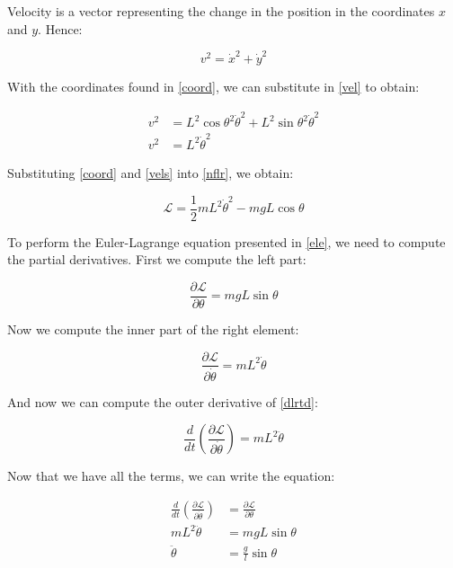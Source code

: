 \documentclass{article}
\begin{document}
Velocity is a vector representing the change in the position in the coordinates $x$ and $y$. Hence:

\begin{equation} \label{vel}
	v^2=\dot{x}^2+\dot{y}^2
\end{equation}

With the coordinates found in \ref{coord}, we can substitute in \ref{vel} to obtain:

\begin{equation} \label{vels}
	\begin{split}
		v^2&=L^2\cos{\theta}^2\dot{\theta}^2+L^2\sin{\theta}^2\dot{\theta}^2\\
		v^2&=L^2\dot{\theta}^2
	\end{split}
\end{equation}

Substituting \ref{coord} and \ref{vels} into \ref{nflr}, we obtain:

\begin{equation} \label{les}
	\mathcal{L}=\frac{1}{2}mL^2\dot{\theta}^2-mgL\cos{\theta}
\end{equation}

To perform the Euler-Lagrange equation presented in \ref{ele}, we need to compute the partial derivatives. First we compute the left part:

\begin{equation} \label{dlrt}
	\frac{\partial\mathcal{L}}{\partial\theta}=mgL\sin{\theta}
\end{equation}

Now we compute the inner part of the right element:

\begin{equation} \label{dlrtd}
	\frac{\partial\mathcal{L}}{\partial\dot{\theta}}=mL^2\dot{\theta}
\end{equation}

And now we can compute the outer derivative of \ref{dlrtd}:

\begin{equation} \label{dlrtt}
	\frac{d}{dt}\left( \frac{\partial\mathcal{L}}{\partial\dot{\theta}} \right)=mL^2\ddot{\theta}
\end{equation}

Now that we have all the terms, we can write the equation:

\begin{equation} \label{eles}
	\begin{split}
		\frac{d}{dt}\left( \frac{\partial\mathcal{L}}{\partial\dot{\theta}} \right)&=\frac{\partial\mathcal{L}}{\partial\theta}\\
		mL^2\ddot{\theta}&=mgL\sin{\theta}\\
		\ddot{\theta}&=\frac{g}{l}\sin{\theta}
	\end{split}
\end{equation}
\end{document}

